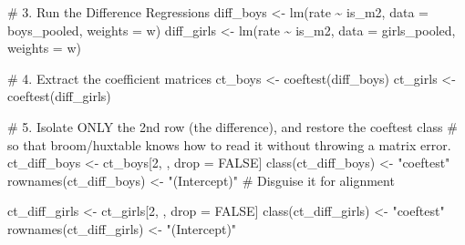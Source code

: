 \documentclass[
  letterpaper,
  DIV=11,
  numbers=noendperiod]{scrartcl}
\newenvironment{Shaded}{\begin{snugshade}}{\end{snugshade}}
\newcommand{\AttributeTok}[1]{\textcolor[rgb]{0.40,0.45,0.13}{#1}}
\newcommand{\CommentTok}[1]{\textcolor[rgb]{0.37,0.37,0.37}{#1}}
\newcommand{\ConstantTok}[1]{\textcolor[rgb]{0.56,0.35,0.01}{#1}}
\newcommand{\DecValTok}[1]{\textcolor[rgb]{0.68,0.00,0.00}{#1}}
\newcommand{\FunctionTok}[1]{\textcolor[rgb]{0.28,0.35,0.67}{#1}}
\newcommand{\NormalTok}[1]{\textcolor[rgb]{0.00,0.23,0.31}{#1}}
\newcommand{\OtherTok}[1]{\textcolor[rgb]{0.00,0.23,0.31}{#1}}
\newcommand{\SpecialCharTok}[1]{\textcolor[rgb]{0.37,0.37,0.37}{#1}}
\newcommand{\StringTok}[1]{\textcolor[rgb]{0.13,0.47,0.30}{#1}}
\begin{document}
\begin{Shaded}
\begin{Highlighting}[]
\CommentTok{\# 3. Run the Difference Regressions}
\NormalTok{diff\_boys }\OtherTok{\textless{}{-}} \FunctionTok{lm}\NormalTok{(rate }\SpecialCharTok{\textasciitilde{}}\NormalTok{ is\_m2, }\AttributeTok{data =}\NormalTok{ boys\_pooled, }\AttributeTok{weights =}\NormalTok{ w)}
\NormalTok{diff\_girls }\OtherTok{\textless{}{-}} \FunctionTok{lm}\NormalTok{(rate }\SpecialCharTok{\textasciitilde{}}\NormalTok{ is\_m2, }\AttributeTok{data =}\NormalTok{ girls\_pooled, }\AttributeTok{weights =}\NormalTok{ w)}

\CommentTok{\# 4. Extract the coefficient matrices}
\NormalTok{ct\_boys }\OtherTok{\textless{}{-}} \FunctionTok{coeftest}\NormalTok{(diff\_boys)}
\NormalTok{ct\_girls }\OtherTok{\textless{}{-}} \FunctionTok{coeftest}\NormalTok{(diff\_girls)}

\CommentTok{\# 5. Isolate ONLY the 2nd row (the difference), and restore the \textquotesingle{}coeftest\textquotesingle{} class}
\CommentTok{\# so that broom/huxtable knows how to read it without throwing a matrix error.}
\NormalTok{ct\_diff\_boys }\OtherTok{\textless{}{-}}\NormalTok{ ct\_boys[}\DecValTok{2}\NormalTok{, , drop }\OtherTok{=} \ConstantTok{FALSE}\NormalTok{]}
\FunctionTok{class}\NormalTok{(ct\_diff\_boys) }\OtherTok{\textless{}{-}} \StringTok{"coeftest"}
\FunctionTok{rownames}\NormalTok{(ct\_diff\_boys) }\OtherTok{\textless{}{-}} \StringTok{"(Intercept)"}  \CommentTok{\# Disguise it for alignment}

\NormalTok{ct\_diff\_girls }\OtherTok{\textless{}{-}}\NormalTok{ ct\_girls[}\DecValTok{2}\NormalTok{, , drop }\OtherTok{=} \ConstantTok{FALSE}\NormalTok{]}
\FunctionTok{class}\NormalTok{(ct\_diff\_girls) }\OtherTok{\textless{}{-}} \StringTok{"coeftest"}
\FunctionTok{rownames}\NormalTok{(ct\_diff\_girls) }\OtherTok{\textless{}{-}} \StringTok{"(Intercept)"}


\end{Highlighting}
\end{Shaded}
\end{document}
